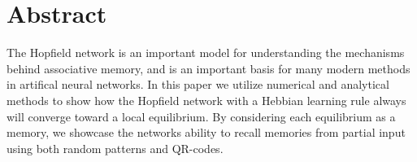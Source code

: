 \section{Abstract}
The Hopfield network is an important model for understanding the mechanisms behind associative memory, and is an important basis for many modern methods in artifical neural networks. In this paper we utilize numerical and analytical methods to show how the Hopfield network with a Hebbian learning rule always will converge toward a local equilibrium. By considering each equilibrium as a memory, we showcase the networks ability to recall memories from partial input using both random patterns and QR-codes.  